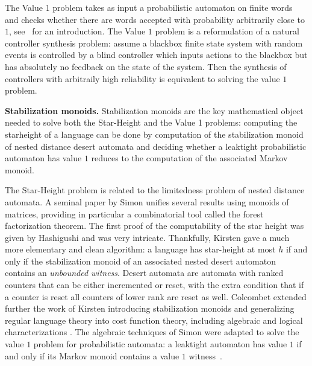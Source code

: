 The Value 1 problem takes as input a probabilistic automaton on finite words and checks whether there are words accepted with probability arbitrarily close to $1$, see~\cite{FGO12} for an introduction.
The Value $1$ problem is a reformulation of a natural controller synthesis problem:
assume a blackbox finite state system with random events
is controlled by a blind controller which inputs actions to the blackbox
but has absolutely no feedback on the state of the system.
Then the synthesis of controllers with arbitraily high reliability is equivalent to solving the value $1$ problem.



\textbf{ Stabilization monoids.} Stabilization monoids are the key mathematical object needed to solve both the Star-Height and the Value 1 problems:
computing the starheight of a language can be done by computation of the stabilization monoid of
nested distance desert automata and deciding whether a leaktight probabilistic automaton has value $1$
reduces to the computation of the associated Markov monoid.

The Star-Height problem is related to the limitedness problem of nested distance automata.
A seminal paper by Simon \cite{Sim94} unifies several results using monoids of matrices, providing in particular a combinatorial tool called the forest factorization theorem. 
The first proof of the computability of the star height was given by Hashigushi and was very intricate.
Thankfully, Kirsten gave a much more elementary and clean algorithm:
a language has star-height at most $h$ if and only if the stabilization monoid of an associated nested desert automaton contains an \emph{unbounded witness}.
Desert automata are automata with ranked counters that can be either incremented or reset,
with the extra condition that if a counter is reset all counters of lower rank are reset as well.
Colcombet extended further the work of Kirsten introducing stabilization monoids and generalizing regular language theory into cost function theory, including algebraic and logical characterizations \cite{Colcombet09,CKL10,Kup14}. 
The algebraic techniques of Simon were adapted to solve the value $1$ problem for probabilistic automata:
a leaktight automaton has value $1$ if and only if its Markov monoid
contains a value $1$ witness~\cite{FGO12}.

